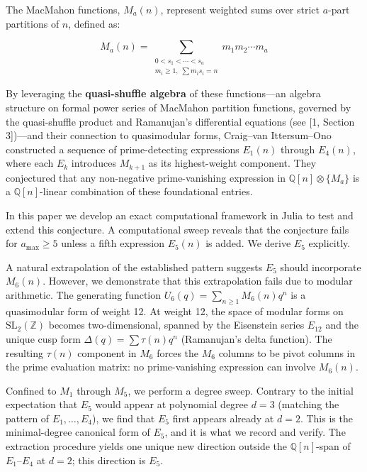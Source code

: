 \documentclass[
  11pt,
]{article}
\begin{document}
The MacMahon functions, \(M_a(n)\), represent weighted sums over strict
\(a\)-part partitions of \(n\), defined as:

\[M_a(n) = \sum_{\substack{0 < s_1 < \cdots < s_a \\ m_i \geq 1,\; \sum m_i s_i = n}} m_1 m_2 \cdots m_a\]

By leveraging the \textbf{quasi-shuffle algebra} of these functions---an
algebra structure on formal power series of MacMahon partition
functions, governed by the quasi-shuffle product and Ramanujan's
differential equations (see {[}1, Section 3{]})---and their connection
to quasimodular forms, Craig--van Ittersum--Ono constructed a sequence
of prime-detecting expressions \(E_1(n)\) through \(E_4(n)\), where each
\(E_k\) introduces \(M_{k+1}\) as its highest-weight component. They
conjectured that any non-negative prime-vanishing expression in
\(\mathbb{Q}[n] \otimes \{M_a\}\) is a \(\mathbb{Q}[n]\)-linear
combination of these foundational entries.

In this paper we develop an exact computational framework in Julia to
test and extend this conjecture. A computational sweep reveals that the
conjecture fails for \(a_{\max} \geq 5\) unless a fifth expression
\(E_5(n)\) is added. We derive \(E_5\) explicitly.

A natural extrapolation of the established pattern suggests \(E_5\)
should incorporate \(M_6(n)\). However, we demonstrate that this
extrapolation fails due to modular arithmetic. The generating function
\(U_6(q) = \sum_{n \geq 1} M_6(n) q^n\) is a quasimodular form of weight
12. At weight 12, the space of modular forms on
\(\mathrm{SL}_2(\mathbb{Z})\) becomes two-dimensional, spanned by the
Eisenstein series \(E_{12}\) and the unique cusp form
\(\Delta(q) = \sum \tau(n) q^n\) (Ramanujan's delta function). The
resulting \(\tau(n)\) component in \(M_6\) forces the \(M_6\) columns to
be pivot columns in the prime evaluation matrix: no prime-vanishing
expression can involve \(M_6(n)\).

Confined to \(M_1\) through \(M_5\), we perform a degree sweep. Contrary
to the initial expectation that \(E_5\) would appear at polynomial
degree \(d=3\) (matching the pattern of \(E_1,\ldots,E_4\)), we find
that \(E_5\) first appears already at \(d=2\). This is the
minimal-degree canonical form of \(E_5\), and it is what we record and
verify. The extraction procedure yields one unique new direction outside
the \(\mathbb{Q}[n]\)-span of \(E_1\)--\(E_4\) at \(d=2\); this
direction is \(E_5\).
\end{document}
